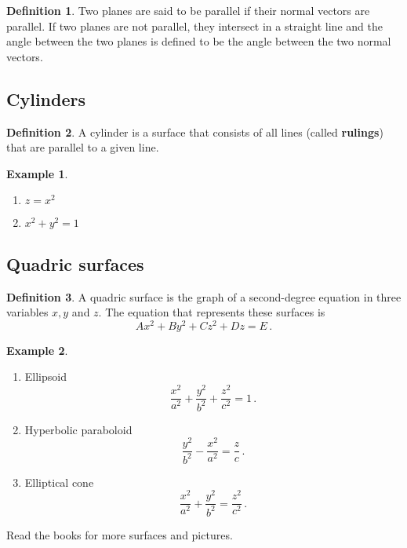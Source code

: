\documentclass[
]{article}
\providecommand{\tightlist}{%
  \setlength{\itemsep}{0pt}\setlength{\parskip}{0pt}}
\theoremstyle{definition}
\newtheorem{definition}{Definition}[section]
\theoremstyle{definition}
\newtheorem{example}{Example}[section]
\theoremstyle{definition}
\theoremstyle{definition}
\theoremstyle{remark}
\begin{document}
\begin{definition}
Two planes are said to be parallel if their normal vectors are parallel.
If two planes are not parallel, they intersect in a straight line and
the angle between the two planes is defined to be the angle between the
two normal vectors.
\end{definition}

\subsection{Cylinders}\label{cylinders}

\begin{definition}
A cylinder is a surface that consists of all lines (called \textbf{rulings}) that
are parallel to a given line.
\end{definition}

\begin{example}
\leavevmode

\begin{enumerate}
\def\labelenumi{\arabic{enumi}.}
\tightlist
\item
  \(z = x^2\)
\item
  \(x^2 + y^2 = 1\)
\end{enumerate}

\end{example}

\subsection{Quadric surfaces}\label{quadric-surfaces}

\begin{definition}
A quadric surface is the graph of a second-degree equation in three variables
\(x,y\) and \(z\).
The equation that represents these surfaces is
\[Ax^2 + By^2 + Cz^2 + Dz = E\,.\]
\end{definition}

\begin{example}
\leavevmode

\begin{enumerate}
\def\labelenumi{\arabic{enumi}.}
\item
  Ellipsoid
  \[\frac{x^2}{a^2} + \frac{y^2}{b^2} + \frac{z^2}{c^2} = 1\,. \]
\item
  Hyperbolic paraboloid
  \[\frac{y^2}{b^2} - \frac{x^2}{a^2} = \frac{z}{c} \,.\]
\item
  Elliptical cone
  \[\frac{x^2}{a^2} + \frac{y^2}{b^2} = \frac{z^2}{c^2} \,.\]
\end{enumerate}

Read the books for more surfaces and pictures.

\end{example}
\end{document}
